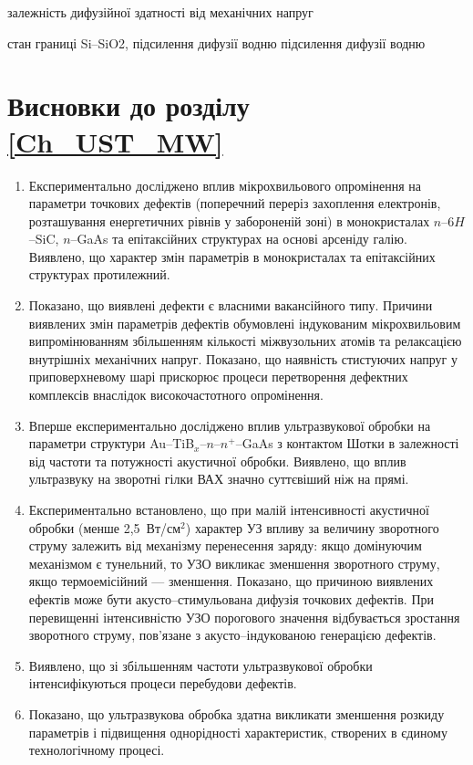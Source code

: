 \documentclass[a4paper,14pt,oneside,openany]{memoir}
\begin{document}
залежність дифузійної здатності від механічних напруг \cite{AZIZ2001}

\cite{Ostap:SiO2} стан границі Si--SiO2, підсилення дифузії водню
\cite{Ostap:PhotoLum,ostapenko1997} підсилення дифузії водню


\section*{Висновки до розділу \ref{Ch_UST_MW}}
  \begin{enumerate}
\item Експериментально досліджено вплив мікрохвильового опромінення на параметри точкових дефектів (поперечний переріз захоплення електронів,
розташування енергетичних рівнів у забороненій зоні) в монокристалах $n$--6$H$--SiC, $n$--GaAs та епітаксійних структурах на основі арсеніду галію.
Виявлено, що характер змін параметрів в монокристалах та епітаксійних структурах протилежний.

\item Показано, що виявлені дефекти є власними вакансійного типу.
Причини виявлених змін параметрів дефектів обумовлені індукованим мікрохвильовим випромінюванням
збільшенням кількості міжвузольних атомів та релаксацією внутрішніх механічних напруг.
Показано, що наявність стистуючих напруг у приповерхневому шарі прискорює процеси перетворення дефектних комплексів внаслідок високочастотного опромінення.

     \item Вперше експериментально досліджено вплив ультразвукової обробки на параметри структури Au--TiB$_x$--$n$--$n^+$--GaAs з контактом Шотки
 в залежності від частоти та потужності акустичної обробки.
Виявлено, що вплив ультразвуку на зворотні гілки ВАХ значно суттєвіший ніж на прямі.

\item Експериментально встановлено, що при малій інтенсивності акустичної обробки (менше 2,5~Вт/см$^2$) характер УЗ впливу за величину зворотного струму залежить від механізму перенесення заряду:
  якщо домінуючим механізмом є тунельний, то УЗО викликає зменшення зворотного струму, якщо термоемісійний --- зменшення.
  Показано, що причиною виявлених ефектів може бути акусто--стимульована дифузія точкових дефектів.
  При перевищенні інтенсивністю УЗО порогового значення відбувається зростання зворотного струму, пов'язане з акусто--індукованою генерацією дефектів.

\item Виявлено, що зі збільшенням частоти ультразвукової обробки інтенсифікуються процеси перебудови дефектів.

\item Показано, що ультразвукова обробка здатна викликати зменшення розкиду параметрів і підвищення однорідності характеристик, створених в єдиному технологічному процесі.
 \end{enumerate}	
\end{document}
